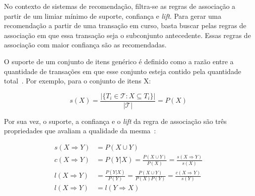     

No contexto de sistemas de recomendação, filtra-se as regras de associação a partir
de um limiar mínimo de suporte, confiança e \textit{lift}. Para gerar uma recomendação
a partir de uma transação em curso, basta buscar pelas regras de associação em
que essa transação seja o subconjunto antecedente. Essas regras de associação com maior
confiança são as recomendadas.


O suporte de um conjunto de itens genérico é definido como a razão entre a
quantidade de transações em que esse conjunto esteja contido pela quantidade
total~\cite{larose2014discovering}. Por exemplo, para o conjunto de itens X:

\begin{equation}
s(X) = \frac{|\{T_i \in \mathcal{T} : X \subseteq T_i\}|}{|\mathcal{T}|} = P(X)
\end{equation}

Por sua vez, o suporte, a confiança e o \textit{lift} da regra de associação são três
propriedades que avaliam a qualidade da mesma~\cite{larose2014discovering}:

\begin{align}
    s(X \Rightarrow Y) &= P( X \cup Y ) \\
    c(X \Rightarrow Y) &= P(Y|X) = \frac{P(X \cup Y)}{P(X)} = \frac{s(X \Rightarrow Y)}{s(X)}  \\
    l(X \Rightarrow Y) &= \frac{P(Y|X)}{P(Y)} = \frac{P(X \cup Y)}{P(X)P(Y)} = \frac{c(X \Rightarrow Y)}{s(Y)}\\
    l(X \Rightarrow Y) &= l(Y \Rightarrow X) 
\end{align}

